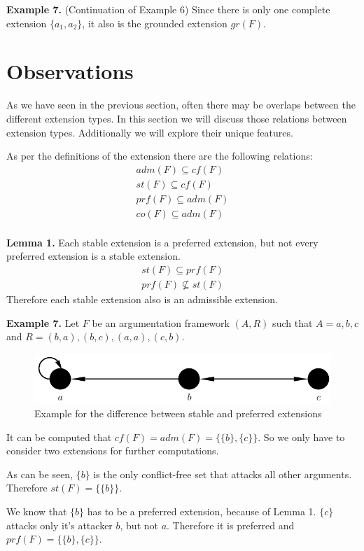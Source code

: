 \documentclass[draft,final]{vutinfth} %
\newcommand{\hl}{\par\medskip}
\newcommand{\dl}{\par\bigskip}
\begin{document}
\textbf{Example 7.} (Continuation of Example 6) Since there is only one complete extension $\{a_1,a_2\}$, it also is the grounded extension $gr(F)$.\dl

\chapter{Observations}

As we have seen in the previous section, often there may be overlaps between the different extension types. In this section we will discuss those relations between extension types. Additionally we will explore their unique features.\dl

As per the definitions of the extension there are the following relations:
\begin{align} %
	adm(F)\subseteq cf(F)\\
	st(F)\subseteq cf(F)\\
	prf(F)\subseteq adm(F)\\
	co(F)\subseteq adm(F)\\
\end{align}\dl

\textbf{Lemma 1.} %
Each stable extension is a preferred extension, but not every preferred extension is a stable extension.\\
\begin{align}
	st(F)\subseteq prf(F)\\
	prf(F)\not\subseteq st(F)
\end{align}
Therefore each stable extension also is an admissible extension.\dl

\textbf{Example 7.} Let $F$ be an argumentation framework $(A,R)$ such that $A={a,b,c}$ and $R={(b,a),(b,c),(a,a),(c,b)}$.

\FloatBarrier
	\begin{figure}[!htb]
		\centering
		\includegraphics[width=\linewidth]{graphs/ex2.pdf}
		\caption{Example for the difference between stable and preferred extensions}
	\end{figure}
\FloatBarrier

It can be computed that $cf(F)=adm(F)=\{\{b\},\{c\}\}$. So we only have to consider two extensions for further computations.\hl
As can be seen, $\{b\}$ is the only conflict-free set that attacks all other arguments. Therefore $st(F)=\{\{b\}\}$.\hl
We know that $\{b\}$ has to be a preferred extension, because of Lemma 1. $\{c\}$ attacks only it's attacker $b$, but not $a$. Therefore it is preferred and $prf(F)=\{\{b\},\{c\}\}$.\dl
\end{document}

